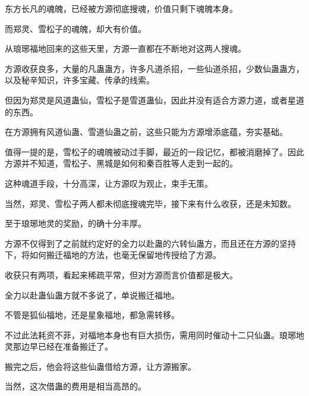 \begin{this_body}
东方长凡的魂魄，已经被方源彻底搜魂，价值只剩下魂魄本身。

而郑灵、雪松子的魂魄，却大有价值。

从琅琊福地回来的这些天里，方源一直都在不断地对这两人搜魂。

方源收获良多，大量的凡蛊蛊方，许多凡道杀招，一些仙道杀招，少数仙蛊蛊方，以及秘辛知识，许多宝藏、传承的线索。

但因为郑灵是风道蛊仙，雪松子是雪道蛊仙，因此并没有适合方源力道，或者星道的东西。

在方源拥有风道仙蛊、雪道仙蛊之前，这些只能为方源增添底蕴，夯实基础。

值得一提的是，雪松子的魂魄被动过手脚，最近的一段记忆，都被消磨掉了。因此方源并不知道，雪松子、黑城是如何和秦百胜等人走到一起的。

这种魂道手段，十分高深，让方源叹为观止，束手无策。

当然，郑灵、雪松子两人都未彻底搜魂完毕，接下来有什么收获，还是未知数。

至于琅琊地灵的奖励，的确十分丰厚。

方源不仅得到了之前就约定好的全力以赴蛊的六转仙蛊方，而且还在方源的坚持下，将如何搬迁福地的方法，也毫无保留地传授给了方源。

收获只有两项，看起来稀疏平常，但对方源而言价值都是极大。

全力以赴蛊仙蛊方就不多说了，单说搬迁福地。

不管是狐仙福地，还是星象福地，都急需转移。

不过此法耗资不菲，对福地本身也有巨大损伤，需用同时催动十二只仙蛊。琅琊地灵那边早已经在准备搬迁了。

搬完之后，他会将这些仙蛊借给方源，让方源搬家。

当然，这次借蛊的费用是相当高昂的。

\end{this_body}

